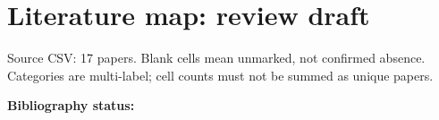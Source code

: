\documentclass[10pt]{article}
\begin{document}
\section*{Literature map: review draft}
Source CSV: 17 papers. Blank cells mean unmarked, not confirmed absence. Categories are multi-label; cell counts must not be summed as unique papers.
\par\smallskip 
\par\smallskip\textbf{Bibliography status:} 
\nocite{anon2020title10,anon2020title12,anon2020title15,anon2020title17,anon2020title19,anon2020title22,anon2020title25,anon2020title28,anon2020title3,anon2020title32,anon2020title35,anon2020title37,anon2020title42,anon2020title45,anon2020title48,anon2020title7,anon2020title8}


\clearpage


\clearpage


\clearpage

\end{document}

